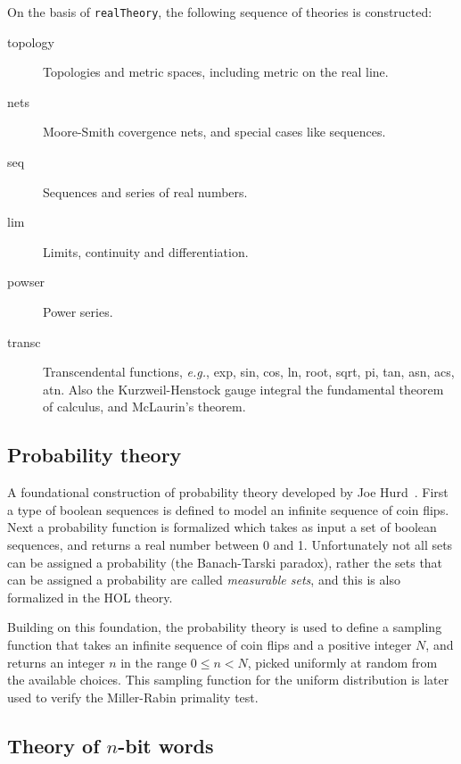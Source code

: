 On the basis of {\small\verb+realTheory+}, the following  sequence of
theories is constructed:

\begin{description}
\item [topology] Topologies and metric spaces, including metric on
the real line.
\item [nets] Moore-Smith covergence nets, and special cases like
sequences.
\item [seq] Sequences and series of real numbers.
\item [lim] Limits, continuity and differentiation.
\item [powser] Power series.
\item [transc] Transcendental functions, \emph{e.g.}, exp, sin,
cos, ln, root, sqrt, pi, tan, asn, acs, atn. Also the Kurzweil-Henstock
gauge integral the fundamental theorem of calculus, and McLaurin's
theorem.

\end{description}

\subsection{Probability theory}\label{prob}

A foundational construction of probability theory developed by Joe
Hurd~\cite{hurd-thesis}. First a type of boolean sequences is defined
to model an infinite sequence of coin flips. Next a probability
function is formalized which takes as input a set of boolean
sequences, and returns a real number between 0 and 1. Unfortunately
not all sets can be assigned a probability (the Banach-Tarski
paradox), rather the sets that can be assigned a probability are
called \emph{measurable sets}, and this is also formalized in the
HOL theory.

Building on this foundation, the probability theory is used to define
a sampling function that takes an infinite sequence of coin flips and
a positive integer $N$, and returns an integer $n$ in the range $0\le
n < N$, picked uniformly at random from the available choices. This
sampling function for the uniform distribution is later used to verify
the Miller-Rabin primality test.

\subsection{Theory of $n$-bit words}

